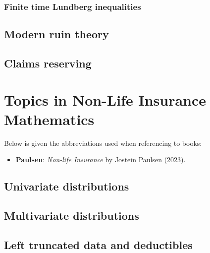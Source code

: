 \documentclass[a4paper,12pt,openany]{book}
\providecommand{\tightlist}{%
 \setlength{\itemsep}{0pt}\setlength{\parskip}{0pt}}
\begin{document}
\hypertarget{finite-time-lundberg-inequalities}{%
\subsection{Finite time Lundberg inequalities}\label{finite-time-lundberg-inequalities}}

\hypertarget{modern-ruin-theory}{%
\section{Modern ruin theory}\label{modern-ruin-theory}}

\hypertarget{claims-reserving}{%
\section{Claims reserving}\label{claims-reserving}}

\hypertarget{topics-in-non-life-insurance-mathematics}{%
\chapter{Topics in Non-Life Insurance Mathematics}\label{topics-in-non-life-insurance-mathematics}}

Below is given the abbreviations used when referencing to books:

\begin{itemize}
\tightlist
\item
  \textbf{Paulsen}: \emph{Non-life Insurance} by Jostein Paulsen (2023).\cite{paulsen2023}
\end{itemize}

\hypertarget{univariate-distributions}{%
\section{Univariate distributions}\label{univariate-distributions}}

\hypertarget{multivariate-distributions}{%
\section{Multivariate distributions}\label{multivariate-distributions}}

\hypertarget{left-truncated-data-and-deductibles}{%
\section{Left truncated data and deductibles}\label{left-truncated-data-and-deductibles}}
\end{document}
